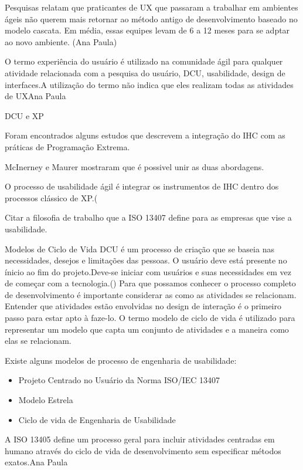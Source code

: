 Pesquisas relatam que praticantes de UX que passaram a trabalhar em ambientes ágeis não querem mais retornar ao método antigo de desenvolvimento baseado no modelo cascata. Em média, essas equipes levam de 6 a 12 meses para se adptar ao novo ambiente. (Ana Paula)

O termo experiência do usuário é utilizado na comunidade ágil para qualquer atividade relacionada com a pesquisa do usuário, DCU, usabilidade, design de interfaces.A utilização do termo não indica que eles realizam todas as atividades de UX{Ana Paula}


DCU e XP

Foram encontrados alguns estudos que descrevem a integração do IHC com as práticas de Programação Extrema.

McInerney e Maurer mostraram que é possivel unir as duas abordagens.

O processo de usabilidade ágil é integrar os instrumentos de IHC dentro dos processos clássico de XP.(






	

Citar a filosofia de trabalho que a  ISO 13407 define para as empresas que vise a usabilidade.



Modelos de Ciclo de Vida
DCU é um processo de criação que se baseia nas necessidades, desejos e limitações das pessoas. O usuário deve está presente no ínicio ao fim do projeto.Deve-se iniciar com usuários e suas necessidades em vez de começar com a tecnologia.()
	Para que possamos conhecer o processo completo de desenvolvimento é importante considerar as como as atividades se relacionam. Entender que atividades estão envolvidas no design de interação é o primeiro passo para estar apto à faze-lo.
	O termo modelo de ciclo de vida é utilizado para representar um modelo que capta um conjunto de atividades e a maneira como elas se relacionam. ~\cite{preece2005}

	Existe alguns modelos de processo de engenharia de usabilidade:

\begin{itemize}
\item Projeto Centrado no Usuário da Norma ISO/IEC 13407
\item Modelo Estrela
\item Ciclo de vida de Engenharia de Usabilidade
\end{itemize}

A ISO 13405 define um processo geral para incluir atividades centradas em humano através do ciclo de vida de desenvolvimento sem especificar métodos exatos.{Ana Paula}




